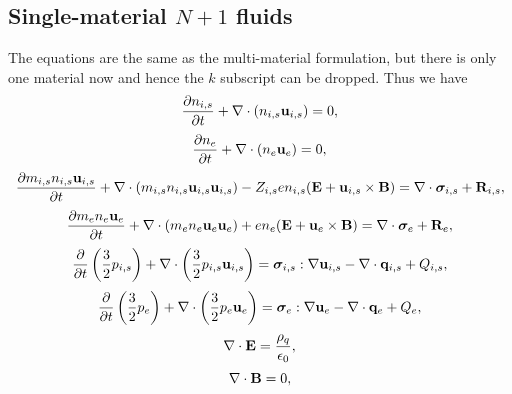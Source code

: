 \documentclass[a4paper,11pt]{report}
\begin{document}
\subsection{Single-material $N+1$ fluids}
\label{sec:mf_np1fluid_equations}
The equations are the same as the multi-material formulation, but there is only one material now and hence the $k$ subscript can be dropped. Thus we have 
\begin{equation}
    \label{eq:mf_np1fluid_ni}
    \frac{\partial n_{i,s}}{\partial t} + \nabla \cdot \left ( n_{i,s} \mathbf{u}_{i,s} \right ) = 0,
\end{equation}
\begin{equation}
    \label{eq:mf_np1fluid_ne}
    \frac{\partial n_e}{\partial t} + \nabla \cdot \left ( n_e \mathbf{u}_e \right ) = 0,
\end{equation}
\begin{equation}
    \label{eq:mf_np1fluid_ui}
    \frac{\partial m_{i,s} n_{i,s} \mathbf{u}_{i,s}}{\partial t} + \nabla \cdot \left( m_{i,s} n_{i,s} \mathbf{u}_{i,s} \mathbf{u}_{i,s} \right) - Z_{i,s} e n_{i,s} ( \mathbf{E} + \mathbf{u}_{i,s} \times \mathbf{B} ) = \nabla \cdot \bm \sigma_{i,s} + \mathbf{R}_{i,s},
\end{equation}
\begin{equation}
    \label{eq:mf_np1fluid_ue}
    \frac{\partial m_e n_e \mathbf{u}_e}{\partial t} + \nabla \cdot \left ( m_e n_e \mathbf{u}_e \mathbf{u}_e \right) + e n_e ( \mathbf{E} + \mathbf{u}_e \times \mathbf{B} ) = \nabla \cdot \bm \sigma_e + \mathbf{R}_e,
\end{equation}
\begin{equation}
    \label{eq:mf_np1fluid_iei}
    \frac{\partial}{\partial t} \left ( \frac{3}{2} p_{i,s} \right ) + \nabla \cdot \left ( \frac{3}{2} p_{i,s} \mathbf{u}_{i,s} \right ) = \bm \sigma_{i,s} : \nabla \mathbf{u}_{i,s} - \nabla \cdot \mathbf{q}_{i,s} + Q_{i,s},
\end{equation}
\begin{equation}
    \label{eq:mf_np1fluid_iee}
    \frac{\partial}{\partial t} \left ( \frac{3}{2} p_e \right ) + \nabla \cdot \left ( \frac{3}{2} p_e \mathbf{u}_e \right ) = \bm \sigma_e : \nabla \mathbf{u}_e - \nabla \cdot \mathbf{q}_e + Q_e,
\end{equation}
\begin{equation}
    \label{eq:mf_np1fluid_maxwell_3}
    \nabla \cdot \mathbf{E} = \frac{\rho_q}{\epsilon_0},
\end{equation}
\begin{equation}
    \label{eq:mf_np1fluid_maxwell_4}
    \nabla \cdot \mathbf{B} = 0,
\end{equation}
\end{document}
